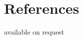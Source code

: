 \documentclass[11pt,a4paper,roman]{moderncv}       %
\begin{document}








\section{References}

\vspace{6pt}
 
available on request

\nocite{*}



\end{document}
